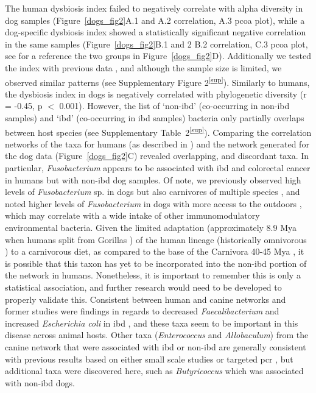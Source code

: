 The human dysbiosis index failed to negatively correlate with alpha diversity in dog samples (Figure~\ref{dogs_fig2}A.1 and A.2 correlation, A.3 \gls{pcoa} plot), while a dog-specific dysbiosis index showed a statistically significant negative correlation in the same samples (Figure~\ref{dogs_fig2}B.1 and 2 B.2 correlation, C.3 \gls{pcoa} plot, see for a reference the two groups in Figure~\ref{dogs_fig2}D). Additionally we tested the index with previous data \cite{RN153}, and although the sample size is limited, we observed similar patterns (see Supplementary Figure 2\textsuperscript{\ref{sup}}). Similarly to humans, the dysbiosis index in dogs is negatively correlated with phylogenetic diversity (r = -0.45, p $<$ 0.001). However, the list of `non-\gls{ibd}' (co-occurring in non-\gls{ibd} samples) and `\gls{ibd}' (co-occurring in \gls{ibd} samples) bacteria only partially overlaps between host species (see Supplementary Table~2\textsuperscript{\ref{sup}}). Comparing the correlation networks of the taxa for humans (as described in \cite{RN154}) and the network generated for the dog data (Figure~\ref{dogs_fig2}C) revealed overlapping, and discordant taxa. In particular, \textit{Fusobacterium} appears to be associated with \gls{ibd} \cite{RN154} and colorectal cancer \cite{RN3983} in humans but with non-\gls{ibd} dog samples. Of note, we previously observed high levels of \textit{Fusobacterium} sp. in dogs \cite{RN150} but also carnivores of multiple species \cite{RN8250, RN172}, and noted higher levels of \textit{Fusobacterium} in dogs with more access to the outdoors \cite{RN17447}, which may correlate with a wide intake of other immunomodulatory environmental bacteria. Given the limited adaptation (approximately 8.9 Mya when humans split from Gorillas \cite{RN3988}) of the human lineage (historically omnivorous \cite{RN3987}) to a carnivorous diet, as compared to the base of the Carnivora 40-45 Mya \cite{RN3989}, it is possible that this taxon has yet to be incorporated into the non-\gls{ibd} portion of the network in humans. Nonetheless, it is important to remember this is only a statistical association, and further research would need to be developed to properly validate this. Consistent between human and canine networks and former studies were findings in regards to decreased \textit{Faecalibacterium} and increased \textit{Escherichia coli} in \gls{ibd} \cite{RN17138}, and these taxa seem to be important in this disease across animal hosts. Other taxa (\textit{Enterococcus} and \textit{Allobaculum}) from the canine network that were associated with \gls{ibd} or non-\gls{ibd} are generally consistent with previous results based on either small scale studies or targeted \gls{pcr} \cite{RN153}, but additional taxa were discovered here, such as \textit{Butyricoccus} which was associated with non-\gls{ibd} dogs.

